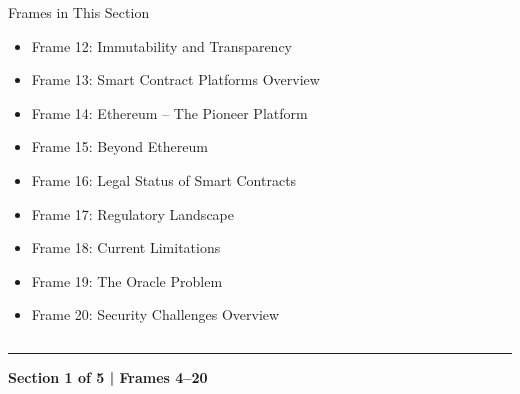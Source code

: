 \documentclass[8pt,aspectratio=169]{beamer}
\newcommand{\bottomnote}[1]{\vfill\vspace{-2mm}\textcolor{mllavender2}{\rule{\textwidth}{0.4pt}}\vspace{1mm}\footnotesize\textbf{#1}}
\begin{document}
\begin{frame}{}
\begin{columns}[T]
\begin{block}{Frames in This Section}
\begin{itemize}
  \item Frame 12: Immutability and Transparency
  \item Frame 13: Smart Contract Platforms Overview
  \item Frame 14: Ethereum -- The Pioneer Platform
  \item Frame 15: Beyond Ethereum
  \item Frame 16: Legal Status of Smart Contracts
  \item Frame 17: Regulatory Landscape
  \item Frame 18: Current Limitations
  \item Frame 19: The Oracle Problem
  \item Frame 20: Security Challenges Overview
\end{itemize}
\end{block}
\end{columns}
\bottomnote{Section 1 of 5 | Frames 4--20}
\end{frame}
\end{document}
